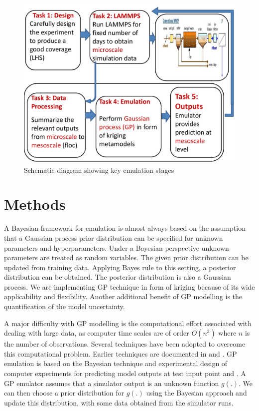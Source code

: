 
\begin{figure}[!ht] 
\includegraphics[width=1\textwidth]{result2/summ}
\caption[]{Schematic diagram showing key emulation stages}\label{diag2c}
\end{figure}

\newpage
\section{Methods}
 A Bayesian framework for emulation is almost always based on the assumption that a Gaussian process prior distribution can be specified for unknown parameters and hyperparameters.  Under a Bayesian perspective unknown parameters are treated as random variables. The given prior distribution can be updated from training data. Applying Bayes rule to this setting, a posterior distribution can be obtained. The posterior distribution is also a Gaussian process. We are implementing GP technique in form of kriging because of its wide applicability and flexibility. Another additional benefit of GP modelling is the quantification of the model uncertainty.

A major difficulty with GP modelling is the computational effort associated with dealing with large data, as computer time scales are of order $O(n^3)$ where $n$ is the number of observations. Several techniques have been adopted to overcome this computational problem. Earlier techniques are documented in \citet{q10} and \cite{q47}. GP emulation is based on the Bayesian technique and experimental design of computer experiments for predicting model outputs at test input point \citet{q7} and \citet{70}. A GP emulator assumes that a simulator output is an unknown function $g(.)$. We can then choose a prior distribution for $g(.)$ using the Bayesian approach and update this distribution, with some data obtained from the simulator runs.

